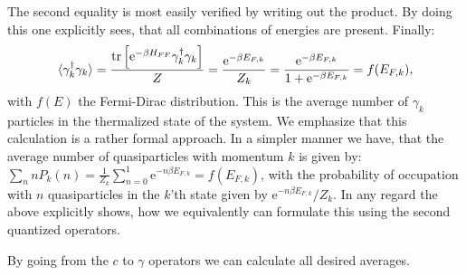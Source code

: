 The second equality is most easily verified by writing out the product. By doing this one explicitly sees, that all combinations of energies are present. Finally: 
\begin{equation}
\braket{\gamma^\dagger_k\gamma_k} = \frac{\operatorname{tr}\left[\text{e}^{-\beta H_{FF}}\gamma^\dagger_k\gamma_k\right]}{Z} = \frac{\text{e}^{-\beta E_{F,k}}}{Z_k} = \frac{\text{e}^{-\beta E_{F,k}}}{1 + \text{e}^{-\beta E_{F,k}}} = f(E_{F,k}),
\end{equation}
with $f(E)$ the Fermi-Dirac distribution. This is the average number of $\gamma_k$ particles in the thermalized state of the system. We emphasize that this calculation is a rather formal approach. In a simpler manner we have, that the average number of quasiparticles with momentum $k$ is given by: $\sum_n n P_k(n) = \frac{1}{Z_k}\sum_{n = 0}^{1} \text{e}^{ -n\beta E_{F,k} } = f( E_{F,k} )$, with the probability of occupation with $n$ quasiparticles in the $k$'th state given by $\text{e}^{-n\beta E_{F,k}}/Z_k$. In any regard the above explicitly shows, how we equivalently can formulate this using the second quantized operators. 

By going from the $c$ to $\gamma$ operators we can calculate all desired averages.

